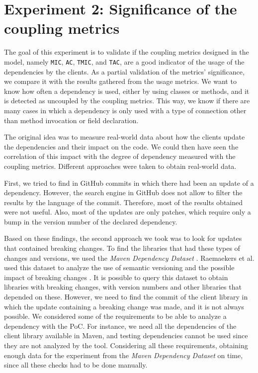 \section{Experiment 2: Significance of the coupling metrics}

The goal of this experiment is to validate if the coupling metrics designed in the model, namely \texttt{MIC}, \texttt{AC}, \texttt{TMIC}, and \texttt{TAC}, are a good indicator of the usage of the dependencies by the clients. As a partial validation of the metrics' significance, we compare it with the results gathered from the usage metrics. We want to know how often a dependency is used, either by using classes or methods, and it is detected as uncoupled by the coupling metrics. This way, we know if there are many cases in which a dependency is only used with a type of connection other than method invocation or field declaration.


The original idea was to measure real-world data about how the clients update the dependencies and their impact on the code. We could then have seen the correlation of this impact with the degree of dependency measured with the coupling metrics. Different approaches were taken to obtain real-world data.

First, we tried to find in GitHub commits in which there had been an update of a dependency. However, the search engine in GitHub does not allow to filter the results by the language of the commit. Therefore, most of the results obtained were not useful. Also, most of the updates are only patches, which require only a bump in the version number of the declared dependency.

Based on these findings, the second approach we took was to look for updates that contained breaking changes. To find the libraries that had these types of changes and versions, we used the \textit{Maven Dependency Dataset} \cite{Raemaekers2013}. Raemaekers et al. used this dataset to analyze the use of semantic versioning and the possible impact of breaking changes \cite{Raemaekers2017}. It is possible to query this dataset to obtain libraries with breaking changes, with version numbers and other libraries that depended on these. However, we need to find the commit of the client library in which the update containing a breaking change was made, and it is not always possible. We considered some of the requirements to be able to analyze a dependency with the PoC. For instance, we need all the dependencies of the client library available in Maven, and testing dependencies cannot be used since they are not analyzed by the tool. Considering all these requirements, obtaining enough data for the experiment from the \textit{Maven Dependency Dataset} on time, since all these checks had to be done manually.

